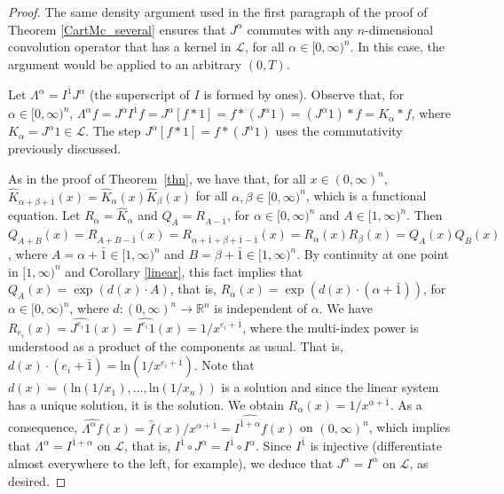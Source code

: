 \documentclass[12pt,reqno]{amsart}
\theoremstyle{plain}
\numberwithin{equation}{section} %
\begin{document}
\begin{proof}
The same density argument used in the first paragraph of the proof of Theorem \ref{CartMc_several} ensures that $J^\alpha$ commutes with any $n$-dimensional convolution operator that has a kernel in $\mathcal{L}$, for all $\alpha\in [0,\infty)^n$. In this case, the argument would be applied to an arbitrary $(0,T)$.

Let $\Lambda^\alpha =I^{\bar{1}} J^\alpha$ (the superscript of $I$ is formed by ones). Observe that, for $\alpha\in [0,\infty)^n$, $\Lambda^\alpha f=J^\alpha I^{\bar{1}} f=J^\alpha[f\ast 1]=f\ast (J^\alpha 1)=(J^\alpha 1)\ast f=K_\alpha\ast f$, where $K_\alpha=J^\alpha 1\in\mathcal{L}$. The step $J^\alpha[f\ast 1]=f\ast (J^\alpha 1)$ uses the commutativity previously discussed.

As in the proof of Theorem~\ref{thn}, we have that, for all $x\in (0,\infty)^n$, $\widehat{K}_{\alpha+\beta+\bar{1}}(x)=\widehat{K}_\alpha(x)\widehat{K}_\beta(x)$ for all $\alpha,\beta\in [0,\infty)^n$, which is a functional equation. Let $R_\alpha=\widehat{K}_\alpha$ and $Q_A=R_{A-\bar{1}}$, for $\alpha\in [0,\infty)^n$ and $A\in [1,\infty)^n$. Then $Q_{A+B}(x)=R_{A+B-\bar{1}}(x)=R_{\alpha+\bar{1}+\beta+\bar{1}-\bar{1}}(x)=R_\alpha(x) R_\beta(x)=Q_A(x) Q_B(x)$, where $A=\alpha+\bar{1}\in [1,\infty)^n$ and $B=\beta+\bar{1}\in [1,\infty)^n$. By continuity at one point in $[1,\infty)^n$ and Corollary \ref{linear}, this fact implies that $Q_A(x)=\exp(d(x)\cdot A)$, that is, $R_\alpha(x)=\exp(d(x)\cdot(\alpha+\bar{1}))$, for $\alpha\in [0,\infty)^n$, where $d:(0,\infty)^n\rightarrow\mathbb{R}^n$ is independent of $\alpha$. We have $R_{e_i}(x)=\widehat{J^{e_i} 1}(x)=\widehat{I^{e_i} 1}(x)=1/x^{e_i+\bar{1}}$, where the multi-index power is understood as a product of the components as usual. That is, $d(x)\cdot (e_i+\bar{1})=\mathrm{ln}(1/x^{e_i+\bar{1}})$. Note that $d(x)=(\mathrm{ln}(1/x_1),\ldots,\mathrm{ln}(1/x_n))$ is a solution and since the linear system has a unique solution, it is the solution. We obtain $R_\alpha(x)=1/x^{\alpha+\bar{1}}$. As a consequence, $\widehat{\Lambda^\alpha f}(x)=\widehat{f}(x)/x^{\alpha+\bar{1}}=\widehat{I^{\bar{1}+\alpha} f}(x)$ on $(0,\infty)^n$, which implies that $\Lambda^\alpha=I^{\bar{1}+\alpha}$ on $\mathcal{L}$, that is, $I^{\bar{1}}\circ J^\alpha=I^{\bar{1}} \circ I^\alpha$. Since $I^{\bar{1}}$ is injective (differentiate almost everywhere to the left, for example), we deduce that $J^\alpha=I^\alpha$ on $\mathcal{L}$, as desired.
\end{proof}
\end{document}

